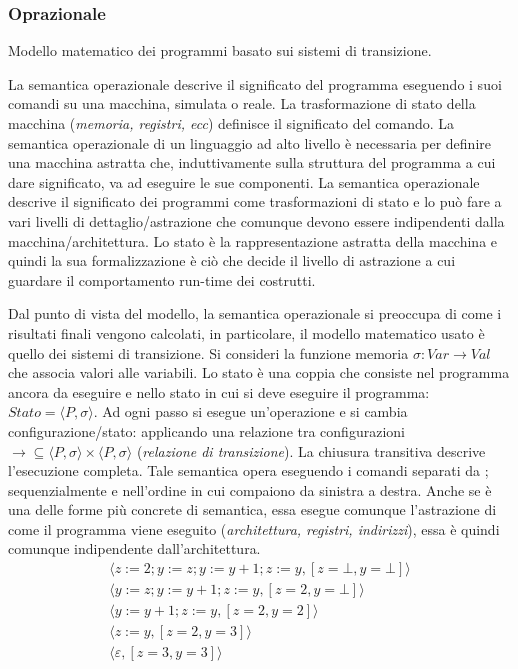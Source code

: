 \documentclass[oneside,a4paper,11pt]{book}
\theoremstyle{italicstyle}
\theoremstyle{normStyle}
\begin{document}
\subsubsection{Oprazionale}
\begin{tcolorbox}[title={Semantica operazionale}]
Modello matematico dei programmi basato sui sistemi di transizione.
\end{tcolorbox}
La semantica operazionale descrive il significato del programma
eseguendo i suoi comandi su una macchina, simulata o reale.
La trasformazione di stato della macchina (\textit{memoria, registri, ecc})
definisce il significato del comando. La semantica operazionale
di un linguaggio ad alto livello è necessaria per definire una
macchina astratta che, induttivamente sulla struttura del programma
a cui dare significato, va ad eseguire le sue componenti. La semantica
operazionale descrive il significato dei programmi come trasformazioni
di stato e lo può fare a vari livelli di dettaglio/astrazione che
comunque devono essere indipendenti dalla macchina/architettura. Lo
stato è la rappresentazione astratta della macchina e quindi la sua
formalizzazione è ciò che decide il livello di astrazione a cui guardare
il comportamento run-time dei costrutti. 

Dal punto di vista del modello,
la semantica operazionale si preoccupa di come i risultati finali
vengono calcolati, in particolare, il modello matematico usato è
quello dei sistemi di transizione. Si consideri la funzione memoria
$\sigma: Var \rightarrow Val$ che associa valori alle variabili.
Lo stato è una coppia che consiste nel programma ancora da eseguire
e nello stato in cui si deve eseguire il programma:$Stato = \langle P, \sigma\rangle$.
Ad ogni passo si esegue un’operazione e si cambia configurazione/stato:
applicando una relazione tra configurazioni $\rightarrow \subseteq \langle P,
\sigma\rangle \times \langle P, \sigma\rangle$
(\textit{relazione di transizione}). La chiusura transitiva descrive
l'esecuzione completa. Tale semantica opera eseguendo i comandi
separati da ; sequenzialmente e nell’ordine in cui compaiono da
sinistra a destra.  Anche se è una delle forme più concrete di
semantica, essa esegue comunque l'astrazione di come il programma
viene eseguito (\textit{architettura, registri, indirizzi}), essa è
quindi comunque  indipendente dall'architettura.
\[
\begin{split}
  \langle z:=2;y:=z;y:=y+1;z:=y,[z= \bot,y= \bot]\rangle \\
  \langle y:=z;y:=y+1;z:=y,[z= 2,y= \bot]\rangle \\
  \langle y:=y+1;z:=y,[z= 2,y= 2]\rangle \\
  \langle z:=y,[z= 2,y= 3]\rangle \\
  \langle \varepsilon, [z= 3,y= 3]\rangle \\
\end{split}
\]
\end{document}
